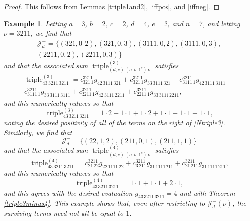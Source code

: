 \documentclass[12pt]{article}
\newtheorem{example}{Example}
\begin{document}
\begin{proof}
 This follows from Lemmas \ref{triple1and2}, \ref{iffpos}, and \ref{iffneg}. 
\end{proof}

\begin{example}\label{extriple3and4}
 Letting $a = 3$, $b = 2$, $c = 2$, $d = 4$, $e=3$, and $n =7$, and letting $\nu = 3211$, we find that 
\begin{multline*}
 \mathcal{J}_{d}^{+} = \big\{ (321, 0, 2), (321, 0, 3), (3111, 0, 2), (3111, 0, 3), \\ 
 (2211, 0, 2), (2211, 0, 3) \big\}
\end{multline*}
 and that the associated sum $ \operatorname{triple}^{(3)}_{(d, e) \, (a, b, 1^{c}) \, \nu }$ satisfies 
\begin{multline*}
 \operatorname{triple}_{43 \, 3211 \, 3211}^{(3)} = c_{321 \, 1}^{3211} g_{42 \, 3111 \, 321} + c_{321 \, 1}^{3211} g_{33 \, 3111 \, 
 321} + c_{3111 \, 1}^{3211} g_{42 \, 3111 \, 3111} + \\ 
 c_{3111 \, 1}^{3211} g_{33 \, 3111 \, 3111} + c_{2211 \, 1}^{3211} g_{42 \, 3111 \, 2211} + c_{2211 \, 1}^{3211} g_{33 \, 3111 \, 2211}, 
\end{multline*}
 and this numerically reduces so that 
\begin{equation}\label{Ntriple3}
 \operatorname{triple}_{43 \, 3211 \, 3211}^{(3)} = 1 \cdot 2 + 1 \cdot 1 + 1 \cdot 2 + 1 \cdot 1 + 1 \cdot 1 + 1 \cdot 1, 
\end{equation}
 noting the desired positivity of all of the terms on the right of \eqref{Ntriple3}. Similarly, we find that $$ \mathcal{J}^{-}_{d} = \big\{ (22,
 1, 2), (211, 0, 1), (211, 1, 1) \big\} $$ and that the associated sum $ \operatorname{triple}^{(4)}_{(d, e) \, (a, b, 1^{c}) \, \nu }$ satisfies 
 $$ \operatorname{triple}_{43 \, 3211 \, 3211}^{(4)} = c_{21 \, 22}^{3211} g_{22 \, 1111 \, 22} + c_{3 \, 211}^{3211} g_{31 \, 1111 \, 211} 
 + c_{21 \, 211}^{3211} g_{31 \, 1111 \, 211}, $$ and this numerically reduces so that 
\begin{equation}\label{counterto1}
 \operatorname{triple}_{43 \, 3211 \, 3211}^{(4)} = 1 \cdot 1 + 1 \cdot 1 + 2 \cdot 1, 
\end{equation}
 and this agrees with the desired evaluation $ g_{43 \, 3211 \, 3211} = 4 $ and with Theorem \ref{triple3minus4}. This example shows 
 that, even after restricting to $\mathcal{J}_{d}^{-}(\nu)$, the surviving terms need not all be equal to $1$. 
\end{example}
\end{document}
